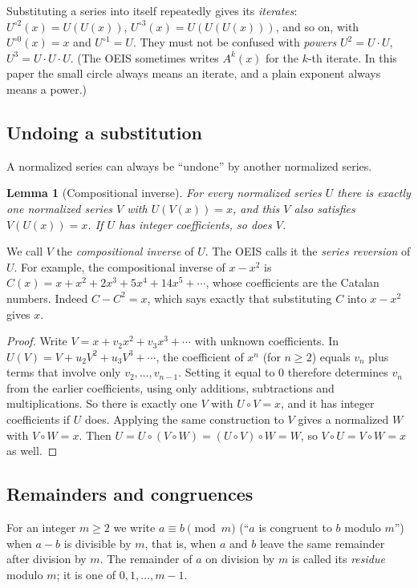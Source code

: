 \documentclass[11pt,a4paper]{article}
\newtheorem{lemma}[theorem]{Lemma}
\theoremstyle{definition}
\theoremstyle{remark}
\begin{document}
Substituting a series into itself repeatedly gives its \emph{iterates}: $U^{\circ2}(x)=U(U(x))$,
$U^{\circ3}(x)=U(U(U(x)))$, and so on, with $U^{\circ0}(x)=x$ and $U^{\circ1}=U$. They must not be confused with
\emph{powers} $U^2=U\cdot U$, $U^3=U\cdot U\cdot U$. (The OEIS sometimes writes $A^k(x)$ for the $k$-th iterate. In
this paper the small circle always means an iterate, and a plain exponent always means a power.)

\subsection{Undoing a substitution}
A normalized series can always be ``undone'' by another normalized series.

\begin{lemma}[Compositional inverse]\label{lem:inverse}
For every normalized series $U$ there is exactly one normalized series $V$ with $U(V(x))=x$, and this $V$ also
satisfies $V(U(x))=x$. If $U$ has integer coefficients, so does $V$.
\end{lemma}

We call $V$ the \emph{compositional inverse} of $U$. The OEIS calls it the \emph{series reversion} of $U$. For example,
the compositional inverse of $x-x^2$ is $C(x)=x+x^2+2x^3+5x^4+14x^5+\cdots$, whose coefficients are the Catalan numbers.
Indeed $C-C^2=x$, which says exactly that substituting $C$ into $x-x^2$ gives $x$.

\begin{proof}
Write $V=x+v_2x^2+v_3x^3+\cdots$ with unknown coefficients. In
$U(V)=V+u_2V^2+u_3V^3+\cdots$, the coefficient of $x^n$ (for $n\ge2$) equals $v_n$ plus terms that involve only
$v_2,\dots,v_{n-1}$. Setting it equal to $0$ therefore determines $v_n$ from the earlier coefficients, using only
additions, subtractions and multiplications. So there is exactly one $V$ with $U\circ V=x$, and it has integer
coefficients if $U$ does. Applying the same construction to $V$ gives a normalized $W$ with $V\circ W=x$. Then
$U=U\circ(V\circ W)=(U\circ V)\circ W=W$, so $V\circ U=V\circ W=x$ as well.
\end{proof}

\subsection{Remainders and congruences}
For an integer $m\ge2$ we write $a\equiv b\pmod m$ (``$a$ is congruent to $b$ modulo $m$'') when $a-b$ is divisible by
$m$, that is, when $a$ and $b$ leave the same remainder after division by $m$. The remainder of $a$ on division by
$m$ is called its \emph{residue} modulo $m$; it is one of $0,1,\dots,m-1$.
\end{document}
